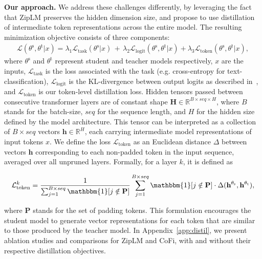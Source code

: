\documentclass{article}
\newcommand{\ourmethod}{ZipLM}
\theoremstyle{plain}
\theoremstyle{definition}
\theoremstyle{remark}
\renewcommand{\paragraph}[1]{ \noindent \textbf{#1}}
\begin{document}
\paragraph{Our approach.} We address these challenges differently, by leveraging the fact that \ourmethod{} preserves the hidden dimension size, and propose to use distillation of intermediate token representations across the entire model. The resulting minimization objective consists  of three components:  
\begin{equation}
\begin{aligned}
\mathcal{L}(\theta^\mathrm{s}, \theta^\mathrm{t} | x) = \lambda_\mathrm{1} \mathcal{L}_\mathrm{task}(\theta^\mathrm{s}|x) \, + \, \lambda_\mathrm{2} \mathcal{L}_\mathrm{logit}(\theta^\mathrm{s}, \theta^\mathrm{t}|x) + \lambda_3 \mathcal{L}_\mathrm{token}(\theta^\mathrm{s}, \theta^\mathrm{t}|x),
\end{aligned}
\end{equation}
 where $\theta^{\mathrm{s}}$ and $\theta^{\mathrm{t}}$ represent student and teacher models respectively, $x$ are the inputs, $\mathcal{L}_\mathrm{task}$ is the loss associated with the task (e.g. cross-entropy for text-classification), $\mathcal{L}_\mathrm{logit}$ is the KL-divergence between output logits as described in~\cite{Hinton2015DistillingTK}, and $\mathcal{L}_\mathrm{token}$ is our token-level distillation loss. Hidden tensors passed between consecutive transformer layers are of constant shape $\mathbf{H} \in \mathbb{R}^{B \times seq \times H}$, where $B$ stands for the batch-size, $seq$ for the sequence length, and $H$ for the hidden size defined by the model architecture. This tensor can be interpreted as a collection of $B \times seq$ vectors $\mathbf{h} \in \mathbb{R}^H$, each carrying intermediate model representations of input tokens $x$. We define the loss $\mathcal{L}_\mathrm{token}$ as an Euclidean distance $\Delta$ between vectors $\mathbf{h}$ corresponding to each non-padded token in the input sequence, averaged over all unpruned layers. Formally, for a layer $k$, it is defined as 

\begin{equation}
\mathcal{L}_\mathrm{token}^k = \frac{1}{\sum_{j=1}^{B \times seq} \mathbbm{1}[j \notin \mathbf{P}]} \sum_{j=1}^{B \times seq} \mathbbm{1}[j \notin \mathbf{P}] \cdot \Delta(\mathbf{h}^{\theta_\mathrm{s}}, \mathbf{h}^{\theta_\mathrm{t}}),
\end{equation}

where $\mathbf{P}$ stands for the set of padding tokens. This formulation encourages the student model to generate vector representations for each token that are similar to those produced by the teacher model. In Appendix~\ref{app:distil}, we present ablation studies and comparisons for ZipLM and CoFi, with and without their respective distillation objectives.
\end{document}
